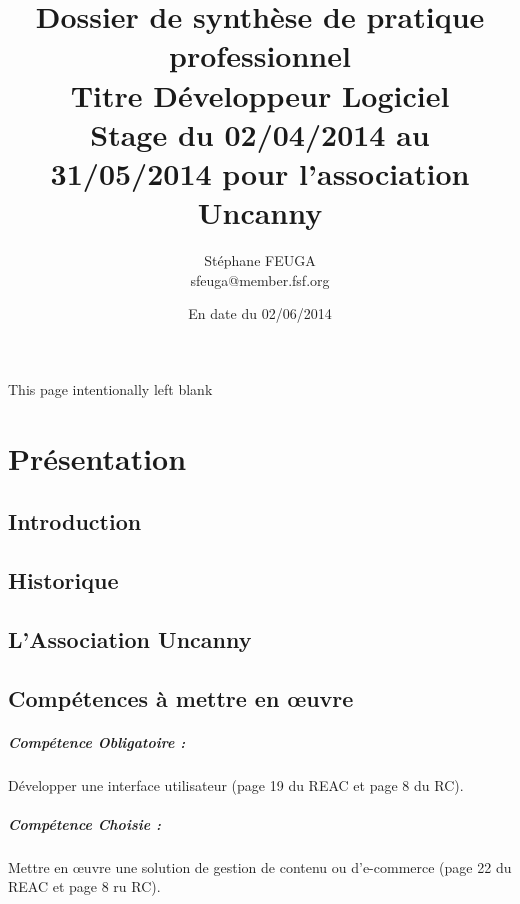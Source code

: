 \documentclass[11pt,a4paper]{report}
\author{Stéphane FEUGA\\{\small sfeuga@member.fsf.org}}
\title{{\Huge Dossier de synthèse de pratique professionnel\\
Titre Développeur Logiciel}\\
{\normalsize Stage du 02/04/2014 au 31/05/2014 pour l'association Uncanny}}
\date {En date du 02/06/2014}
\begin{document}
\maketitle

\begin{center}
This page intentionally left blank
\thispagestyle{empty}
\end{center}

\tableofcontents

\chapter{Présentation}
	\section{Introduction}
		\paragraph*{}
	\section{Historique}
		\paragraph*{}
	\section{L'Association Uncanny}
		\paragraph*{}
	\section{Compétences à mettre en œuvre}
		\paragraph*{\indent Compétence Obligatoire :} Développer une interface utilisateur (page 19 du REAC et page 8 du RC).
		\paragraph*{\indent Compétence Choisie :} Mettre en œuvre une solution de gestion de contenu ou d’e-commerce (page 22 du REAC et page 8 ru RC).
\end{document}
